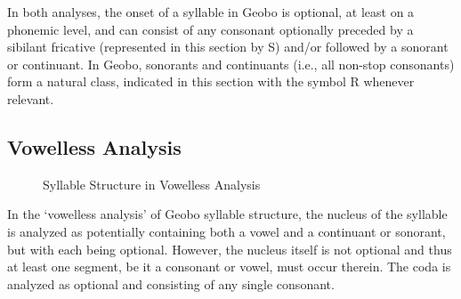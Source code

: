 \documentclass[a4paper,11pt,oneside,openany]{memoir}
\begin{document}
In both analyses, the onset of a syllable in Geobo\engma{} is optional, at least on a phonemic level, and can consist of any consonant optionally preceded by a sibilant fricative (represented in this section by S) and/or followed by a sonorant or continuant. In Geobo\engma{}, sonorants and continuants (i.e., all non-stop consonants) form a natural class, indicated in this section with the symbol R whenever relevant.

\subsection{Vowelless Analysis}

\begin{wrapfigure}{r}{0.35\textwidth}
    \centering
    \caption{Syllable Structure in Vowelless Analysis}
    \label{fig:sylb-struc-vless}
\end{wrapfigure}

In the `vowelless analysis' of Geobo\engma{} syllable structure, the nucleus of the syllable is analyzed as potentially containing both a vowel and a continuant or sonorant, but with each being optional. However, the nucleus itself is not optional and thus at least one segment, be it a consonant or vowel, must occur therein. The coda is analyzed as optional and consisting of any single consonant.
\end{document}
